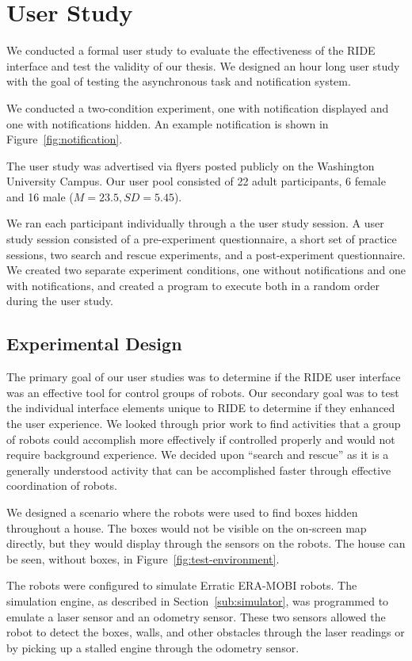 \chapter{User Study}
We conducted a formal user study to evaluate the effectiveness of the RIDE interface and test the validity of our thesis. We designed an hour long user study with the goal of testing the asynchronous task and notification system.

We conducted a two-condition experiment, one with notification displayed and one with notifications hidden. An example notification is shown in Figure~\ref{fig:notification}. 

The user study was advertised via flyers posted publicly on the Washington University Campus. Our user pool consisted of 22 adult participants, 6 female and 16 male ($M=23.5, SD=5.45$).

We ran each participant individually through a the user study session. A user study session consisted of a pre-experiment questionnaire, a short set of practice sessions, two search and rescue experiments, and a post-experiment questionnaire. We created two separate experiment conditions, one without notifications and one with notifications, and created a program to execute both in a random order during the user study.

\section{Experimental Design}
The primary goal of our user studies was to determine if the RIDE user interface was an effective tool for control groups of robots. Our secondary goal was to test the individual interface elements unique to RIDE to determine if they enhanced the user experience. We looked through prior work to find activities that a group of robots could accomplish more effectively if controlled properly and would not require background experience. We decided upon ``search and rescue'' as it is a generally understood activity that can be accomplished faster through effective coordination of robots. 

We designed a scenario where the robots were used to find boxes hidden throughout a house. The boxes would not be visible on the on-screen map directly, but they would display through the sensors on the robots. The house can be seen, without boxes, in Figure~\ref{fig:test-environment}. 

The robots were configured to simulate Erratic ERA-MOBI robots. The simulation engine, as described in Section~\ref{sub:simulator}, was programmed to emulate a laser sensor and an odometry sensor. These two sensors allowed the robot to detect the boxes, walls, and other obstacles through the laser readings or by picking up a stalled engine through the odometry sensor.

